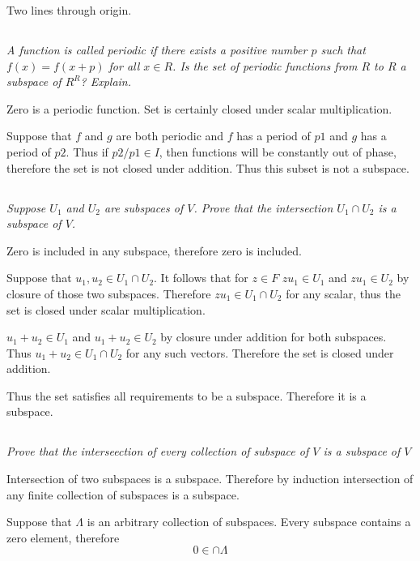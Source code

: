 \documentclass[10pt,oneside,titlepage]{book}
\begin{document}
Two lines through origin.

\subsection{}
\textit{A function is called periodic if there exists a positive number
  $p$ such that $f(x) = f(x + p)$ for all $x \in R$. Is the set of
  periodic functions from $R$ to $R$ a subspace of $R^R$? Explain. }

Zero is a periodic function. Set is
certainly closed under scalar multiplication.

Suppose that $f$ and $g$ are both periodic and $f$ has a period of $p1$
and $g$ has a period of $p2$. Thus if $p2/p1 \in I$,
then functions will be constantly out of phase, therefore the set is not
closed under addition. Thus this subset is not a subspace.

\subsection{}
\textit{Suppose $U_1$ and $U_2$ are subspaces of $V$. Prove that the
  intersection $U_1 \cap U_2$ is a subspace of $V$.}

Zero is included in any subspace, therefore zero is included.

Suppose that $u_1, u_2 \in U_1 \cap U_2$. It follows that for $z \in F$
$zu_1 \in U_1$ and $zu_1 \in U_2$ by closure of those two subspaces.
Therefore $zu_1 \in U_1 \cap U_2$ for any scalar, thus the set is
closed under scalar multiplication.

$u_1 + u_2 \in U_1$ and $u_1 + u_2 \in U_2$ by closure under addition for
both subspaces. Thus $u_1 + u_2 \in U_1 \cap U_2$ for any such vectors.
Therefore the set is closed under addition.

Thus the set satisfies all requirements to be a subspace. Therefore it is a
subspace.

\subsection{}
\textit{Prove that the interseection of every collection of subspace of $V$ is
  a subspace of $V$}

Intersection of two subspaces  is a subspace. Therefore by induction
intersection of any finite collection of subspaces is a subspace.

Suppose that $\Lambda$ is an arbitrary collection of subspaces.
Every subspace contains a zero element, therefore
$$0 \in \cap \Lambda$$
\end{document}
